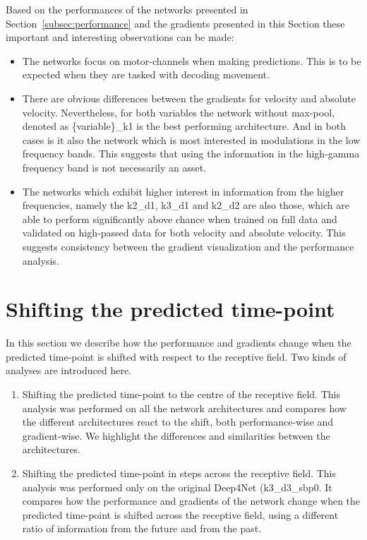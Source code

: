 Based on the performances of the networks presented in Section~\ref{subsec:performance} and the gradients presented in this Section these important and interesting observations can be made:

\begin{itemize}
    \item The networks focus on motor-channels when making predictions.
This is to be expected when they are tasked with decoding movement.
    \item There are obvious differences between the gradients for velocity and absolute velocity.
    Nevertheless, for both variables the network without max-pool, denoted as \{variable\}\_k1 is the best performing architecture.
    And in both cases is it also the network which is most interested in modulations in the low frequency bands.
    This suggests that using the information in the high-gamma frequency band is not necessarily an asset.
    \item The networks which exhibit higher interest in information from the higher frequencies, namely the k2\_d1, k3\_d1 and k2\_d2 are also those, which are able to perform significantly above chance when trained on full data and validated on high-passed data for both velocity and absolute velocity.
    This suggests consistency between the gradient visualization and the performance analysis.

\end{itemize}


\section{Shifting the predicted time-point}\label{sec:shifting-the-predicted-time-point}
In this section we describe how the performance and gradients change when the predicted time-point is shifted with respect to the receptive field.
Two kinds of analyses are introduced here.

\begin{enumerate}
    \item Shifting the predicted time-point to the centre of the receptive field.
This analysis was performed on all the network architectures and compares how the different architectures react to the shift, both performance-wise and gradient-wise.
We highlight the differences and similarities between the architectures.
    \item Shifting the predicted time-point in steps across the receptive field.
This analysis was performed only on the original Deep4Net (k3\_d3\_sbp0.
It compares how the performance and gradients of the network change when the predicted time-point is shifted across the receptive field, using a different ratio of information from the future and from the past.
\end{enumerate}


